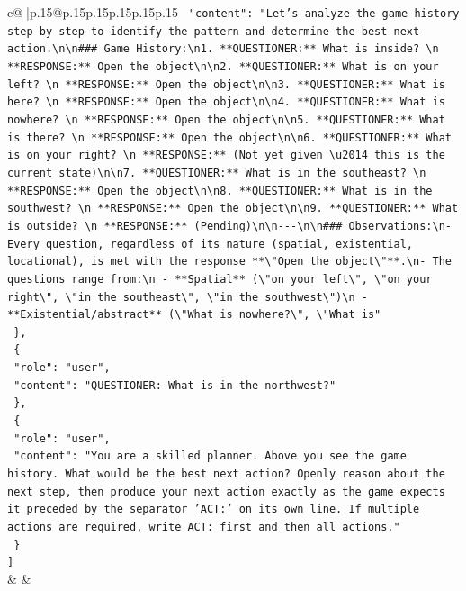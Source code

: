\documentclass{article}
\begin{document}
{\begin{supertabular}{c@{$\;$}|p{.15\linewidth}@{}p{.15\linewidth}p{.15\linewidth}p{.15\linewidth}p{.15\linewidth}p{.15\linewidth}}
{{{\texttt{    "content": "Let's analyze the game history step by step to identify the pattern and determine the best next action.\textbackslash{}n\textbackslash{}n\#\#\# Game History:\textbackslash{}n1. **QUESTIONER:** What is inside?  \textbackslash{}n   **RESPONSE:** Open the object\textbackslash{}n\textbackslash{}n2. **QUESTIONER:** What is on your left?  \textbackslash{}n   **RESPONSE:** Open the object\textbackslash{}n\textbackslash{}n3. **QUESTIONER:** What is here?  \textbackslash{}n   **RESPONSE:** Open the object\textbackslash{}n\textbackslash{}n4. **QUESTIONER:** What is nowhere?  \textbackslash{}n   **RESPONSE:** Open the object\textbackslash{}n\textbackslash{}n5. **QUESTIONER:** What is there?  \textbackslash{}n   **RESPONSE:** Open the object\textbackslash{}n\textbackslash{}n6. **QUESTIONER:** What is on your right?  \textbackslash{}n   **RESPONSE:** (Not yet given \textbackslash{}u2014 this is the current state)\textbackslash{}n\textbackslash{}n7. **QUESTIONER:** What is in the southeast?  \textbackslash{}n   **RESPONSE:** Open the object\textbackslash{}n\textbackslash{}n8. **QUESTIONER:** What is in the southwest?  \textbackslash{}n   **RESPONSE:** Open the object\textbackslash{}n\textbackslash{}n9. **QUESTIONER:** What is outside?  \textbackslash{}n   **RESPONSE:** (Pending)\textbackslash{}n\textbackslash{}n{-}{-}{-}\textbackslash{}n\textbackslash{}n\#\#\# Observations:\textbackslash{}n{-} Every question, regardless of its nature (spatial, existential, locational), is met with the response **\textbackslash{}"Open the object\textbackslash{}"**.\textbackslash{}n{-} The questions range from:\textbackslash{}n  {-} **Spatial** (\textbackslash{}"on your left\textbackslash{}", \textbackslash{}"on your right\textbackslash{}", \textbackslash{}"in the southeast\textbackslash{}", \textbackslash{}"in the southwest\textbackslash{}")\textbackslash{}n  {-} **Existential/abstract** (\textbackslash{}"What is nowhere?\textbackslash{}", \textbackslash{}"What is"} \\
\texttt{  \},} \\
\texttt{  \{} \\
\texttt{    "role": "user",} \\
\texttt{    "content": "QUESTIONER: What is in the northwest?"} \\
\texttt{  \},} \\
\texttt{  \{} \\
\texttt{    "role": "user",} \\
\texttt{    "content": "You are a skilled planner. Above you see the game history. What would be the best next action? Openly reason about the next step, then produce your next action exactly as the game expects it preceded by the separator 'ACT:' on its own line. If multiple actions are required, write ACT: first and then all actions."} \\
\texttt{  \}} \\
\texttt{{]}} \\
            }
        }
    }
    & & \\ \\


\end{supertabular}}
\end{document}
